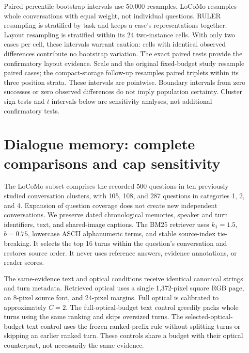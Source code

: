 Paired percentile bootstrap intervals use 50,000 resamples. LoCoMo resamples whole conversations with equal weight, not individual questions. RULER resampling is stratified by task and keeps a case's representations together. Layout resampling is stratified within its 24 two-instance cells. With only two cases per cell, these intervals warrant caution: cells with identical observed differences contribute no bootstrap variation. The exact paired tests provide the confirmatory layout evidence. Scale and the original fixed-budget study resample paired cases; the compact-storage follow-up resamples paired triplets within its three position strata. These intervals are pointwise. Boundary intervals from zero successes or zero observed differences do not imply population certainty. Cluster sign tests and $t$ intervals below are sensitivity analyses, not additional confirmatory tests.

\section{Dialogue memory: complete comparisons and cap sensitivity}
\label{app:locomo}
The LoCoMo subset comprises the recorded 500 questions in ten previously studied conversation clusters, with 105, 108, and 287 questions in categories 1, 2, and 4. Expansion of question coverage does not create new independent conversations. We preserve dated chronological memories, speaker and turn identifiers, text, and shared-image captions. The BM25 retriever uses $k_1=1.5$, $b=0.75$, lowercase ASCII alphanumeric terms, and stable source-index tie-breaking. It selects the top 16 turns within the question's conversation and restores source order. It never uses reference answers, evidence annotations, or reader scores.

The same-evidence text and optical conditions receive identical canonical strings and turn metadata. Retrieved optical uses a single 1,372-pixel square RGB page, an 8-pixel source font, and 24-pixel margins. Full optical is calibrated to approximately $C=2$. The full-optical-budget text control greedily packs whole turns using the same ranking and skips oversized turns. The selected-optical-budget text control uses the frozen ranked-prefix rule without splitting turns or skipping an earlier ranked turn. These controls share a budget with their optical counterpart, not necessarily the same evidence.

\begin{table}[ht]\centering\small
\caption{All principal LoCoMo paired differences, in F1 points. H1: retrieved optical minus full optical. H2: retrieved optical minus same-evidence text. Selected/full budget: the relevant optical arm minus its budgeted-text control.}

\end{table}

